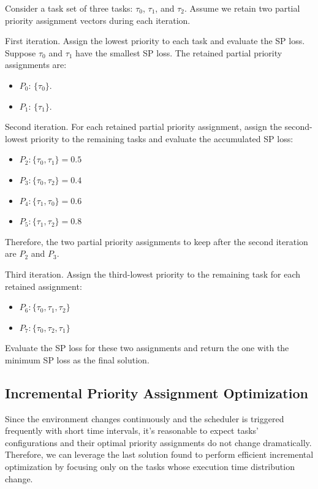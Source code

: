 	\begin{Example}
        Consider a task set of three tasks: $\tau_0$, $\tau_1$, and $\tau_2$.
        Assume we retain two partial priority assignment vectors during each iteration.

        First iteration.
        Assign the lowest priority to each task and evaluate the SP loss.
        Suppose $\tau_0$ and $\tau_1$ have the smallest SP loss.
        The retained partial priority assignments are:
        \begin{itemize}
        \item $P_0$: $\{\tau_0 \}$.
        \item $P_1$: $\{\tau_1 \}$.
        \end{itemize}

        Second iteration.
        For each retained partial priority assignment, assign the second-lowest priority to the remaining tasks and evaluate the accumulated SP loss:
        \begin{itemize}
            \item $P_2: \{\tau_0, \tau_1\} = 0.5$
            \item $P_3: \{\tau_0, \tau_2\} = 0.4$
            \item $P_4: \{\tau_1, \tau_0\} = 0.6$
            \item $P_5: \{\tau_1, \tau_2\} = 0.8$
        \end{itemize}
        Therefore, the two partial priority assignments to keep after the second iteration are $P_2$ and $P_3$.

        Third iteration.
        Assign the third-lowest priority to the remaining task for each retained assignment:
        \begin{itemize}
            \item $P_6:  \{\tau_0, \tau_1, \tau_2\}$
            \item $P_7:  \{\tau_0, \tau_2, \tau_1\}$
        \end{itemize}
        Evaluate the SP loss for these two assignments and return the one with the minimum SP loss as the final solution.
	\end{Example}


	\subsection{Incremental Priority Assignment Optimization}
	\label{section_increment_pa}
    Since the environment changes continuously and the scheduler is triggered frequently with short time intervals, it's reasonable to expect tasks' configurations and their optimal priority assignments do not change dramatically. 
    Therefore, we can leverage the last solution found to perform efficient incremental optimization by focusing only on the tasks whose execution time distribution change.
    
